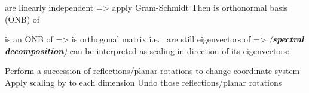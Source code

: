 \begin{itemize}
\begin{itemize}
                        \begin{itemize}

                              \vItem
                                     are linearly
                                    independent => apply Gram-Schmidt
                              \vItem
                                    Then  is
                                    orthonormal basis (ONB) of 
                        \end{itemize}
                  \vItem
                         is
                        an ONB of  =>
                         is
                        orthogonal matrix i.e.~
                  \vItem
                         are still eigenvectors
                        of  => 
                        \emph{(\textbf{spectral decomposition})}
                  \vItem
                         can be interpreted as scaling
                        in direction of its eigenvectors:

                        \begin{enumerate}
                              \vItem
                                    Perform a succession of reflections/planar rotations to change
                                    coordinate-system
                              \vItem
                                    Apply scaling by  to each dimension
                              \vItem
                                    Undo those reflections/planar rotations
                        \end{enumerate}
            \end{itemize}
\end{itemize}